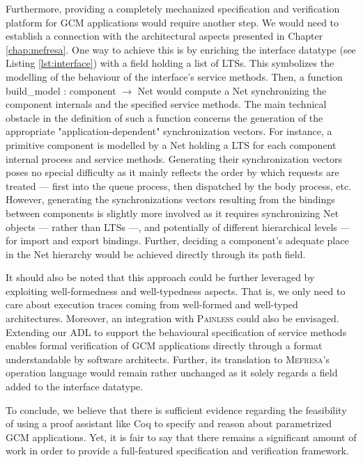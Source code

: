 	
	Furthermore, providing a completely mechanized specification and verification platform for \textsc{GCM}
	applications would require another step. We would need to establish a connection
	with the architectural aspects presented in Chapter \ref{chap:mefresa}. One way to achieve this
	is by enriching the \textsf{interface} datatype (see Listing \ref{lst:interface}) with
	a field holding a list of \textsf{LTS}s. This symbolizes the modelling 
	of the behaviour of the \textsf{interface}'s service methods. Then, a function
	\textsf{build\_model : component $\rightarrow$ Net} would compute a \textsf{Net}
	synchronizing the component internals and the specified service methods. The main
	technical obstacle in the definition of such a function concerns the generation
	of the appropriate "application-dependent" synchronization vectors. For instance, a primitive \textsf{component} is 
	modelled by a \textsf{Net} holding a \textsf{LTS} for each \textsf{component} internal process
	and service methods. Generating their synchronization vectors poses no special difficulty as
	it mainly reflects the order by which requests are treated --- first into the \textsf{queue} process, 
	then 	dispatched by the \textsf{body} process, etc.
	However, generating the synchronizations vectors resulting from the 
	\textsf{binding}s between \textsf{component}s is slightly more involved as it requires
	synchronizing \textsf{Net} objects --- rather than \textsf{LTS}s ---, and 
	potentially of different hierarchical levels --- for \textsf{import} and \textsf{export} 
	\textsf{bindings}. Further, deciding a 
	\textsf{component}'s adequate place in the \textsf{Net}
	hierarchy would be achieved directly through its \textsf{path} field.	
			
		It should also be noted that this approach could be further leveraged 
	by exploiting well-formedness and well-typedness aspects. That is, we 
	only need to care about execution traces coming from well-formed and 
	well-typed architectures. Moreover, an integration with 
	\textsc{Painless} could also be envisaged. Extending our \ac{ADL}
	to support the behavioural
	specification of service methods enables formal verification	
	of \ac{GCM} applications directly through a format understandable by
	software architects. Further, its translation to
	\textsc{Mefresa}'s \textsf{operation} language would remain
	rather unchanged as it solely regards a field added to the \textsf{interface} datatype.
				
	
	To conclude, we believe that there is sufficient evidence regarding the
	feasibility of using a proof assistant like Coq to specify and reason
	about parametrized \ac{GCM} applications. Yet, it is fair to say that there 
	remains a significant amount of work in order to provide a full-featured
	specification and verification framework. 
	
